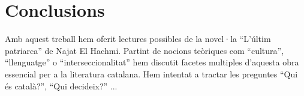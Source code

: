 \section{Conclusions}

Amb aquest treball hem oferit lectures possibles de la novel·la ``L'últim patriarca'' de Najat El Hachmi.
Partint de nocions teòriques com ``cultura'', ``llenguatge'' o ``interseccionalitat'' hem discutit facetes multiples d'aquesta obra essencial per a la literatura catalana.
Hem intentat a tractar les preguntes ``Qui és català?'', ``Qui decideix?'' ...

\begin{comment}
[Vidal2012]
"Y el mundo de El Hachmi no es sino un
palimpsesto, por eso también lo son sus libros, tablillas en la que se aprecian hue-
llas de escrituras/culturas anteriores y en las que leemos la última, que se nos apa-
rece más perceptible. Sin embargo, las huellas persisten."

vlt als eine Art Schlusswort:
-- die Tochter ist die ganze Zeit, trotz dem ganzen shit, eine starke figur
"Jo no ho recordo gaire bé, però es veu que Déu em va il.luminar i vaig fer servir la meva veueta de nena per arreglar els problemes de tota aquella família. O potser tenia el moment de lucidesa més gran que he tingut mai a la vida. Sé que la frase que li vaig dir va ser aquesta, perquè se'n va parlar molt, d'allò. Vaig passar a formar part del recull de llegendes dels Driouch. Per què no deixes d'una vegada aquesta meuca cristiana i fas el favor d'encarregar-te de nosaltres? No et sembla que ja és l'hora que pensis en la teva família?" (p.164-165)

"Em van treure l'aparell de les mans per impertinent i es van escandalitzar, però aviat van estar tots molt orgullosos de mi. Molt." (p.165)

+ la capa de supermana
+ revenge am Ende

"Si jo sóc la mena de persona que sóc és només per culpa seva, jo era ben normal, abans. No és veritat, havia dit jo, i havia mirat la mare. Què? Que no, que no és veritat el que expliques, que tota la història aquesta te la vas inventar tu i si no de què estaries tan preocupat per una filla que no és ni teva? Però ella ho va confessar, va dir que va ser el teu oncle. Ella et va dir que havia estat ell per salvar la vida, per no deixar els seus tres fills sols amb un boig com tu, va ser això el que va passar. [...] però tu ho vas transformar tot per tenir una excusa per anar-te'n de putes, [...] per fer sempre tot el gue t'ha donat la gana." (p.317)
-- sie gibt ihrem vater die meinung

\end{comment}
